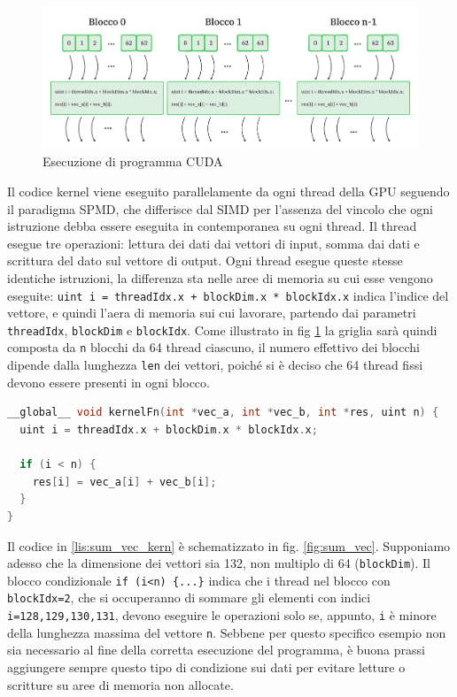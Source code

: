 \begin{figure}[ht]
    \centering
    \includegraphics[width=1\linewidth]{images/chapter2/grid.png}
    \caption{Esecuzione di programma CUDA}
    \label{fig:grid}
\end{figure}

Il codice kernel viene eseguito parallelamente da ogni thread della \gls{GPU} seguendo il paradigma \gls{SPMD}, che differisce dal \gls{SIMD} per l'assenza del vincolo che ogni istruzione debba essere eseguita in contemporanea su ogni thread. Il thread esegue tre operazioni: lettura dei dati dai vettori di input, somma dai dati e scrittura del dato sul vettore di output. Ogni thread esegue queste stesse identiche istruzioni, la differenza sta nelle aree di memoria su cui esse vengono eseguite: \verb|uint i = threadIdx.x + blockDim.x * blockIdx.x| indica l'indice del vettore, e quindi l'aera di memoria sui cui lavorare, partendo dai parametri \verb|threadIdx|, \verb|blockDim| e \verb|blockIdx|. Come illustrato in fig \ref{fig:grid} la griglia sarà quindi composta da \verb|n| blocchi da 64 thread ciascuno, il numero effettivo dei blocchi dipende dalla lunghezza \verb|len| dei vettori, poiché si è deciso che 64 thread fissi devono essere presenti in ogni blocco.

\vspace{5mm}
\begin{lstlisting}[language=C++, caption=Kernel CUDA di somma di vettori, label=lis:sum_vec_kern]
__global__ void kernelFn(int *vec_a, int *vec_b, int *res, uint n) {
  uint i = threadIdx.x + blockDim.x * blockIdx.x;

  if (i < n) {
    res[i] = vec_a[i] + vec_b[i];
  }
}
\end{lstlisting}
\vspace{5mm}

Il codice in \ref{lis:sum_vec_kern} è schematizzato in fig. \ref{fig:sum_vec}. Supponiamo adesso che la dimensione dei vettori sia 132, non multiplo di 64 (\verb|blockDim|). Il blocco condizionale \verb|if (i<n) {...}| indica che i thread nel blocco con \verb|blockIdx=2|, che si occuperanno di sommare gli elementi con indici \verb|i=128,129,130,131|, devono eseguire le operazioni solo se, appunto, \verb|i| è minore della lunghezza massima del vettore \verb|n|. Sebbene per questo specifico esempio non sia necessario al fine della corretta esecuzione del programma, è buona prassi aggiungere sempre questo tipo di condizione sui dati per evitare letture o scritture su aree di memoria non allocate.

